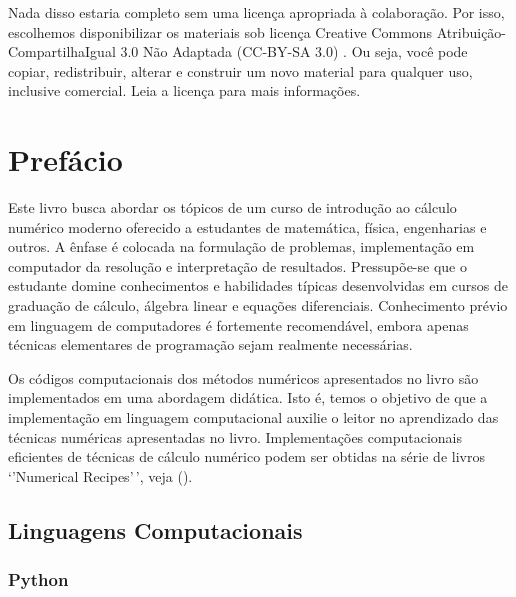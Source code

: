 \documentclass[
  a4paper,
  DIV=11,
  numbers=noendperiod,
  oneside]{scrreprt}
\begin{document}

Nada disso estaria completo sem uma licença apropriada à colaboração.
Por isso, escolhemos disponibilizar os materiais sob licença Creative
Commons Atribuição-CompartilhaIgual 3.0 Não Adaptada (CC-BY-SA 3.0) . Ou
seja, você pode copiar, redistribuir, alterar e construir um novo
material para qualquer uso, inclusive comercial. Leia a licença para
mais informações.


\chapter*{Prefácio}\label{prefuxe1cio}


Este livro busca abordar os tópicos de um curso de introdução ao cálculo
numérico moderno oferecido a estudantes de matemática, física,
engenharias e outros. A ênfase é colocada na formulação de problemas,
implementação em computador da resolução e interpretação de resultados.
Pressupõe-se que o estudante domine conhecimentos e habilidades típicas
desenvolvidas em cursos de graduação de cálculo, álgebra linear e
equações diferenciais. Conhecimento prévio em linguagem de computadores
é fortemente recomendável, embora apenas técnicas elementares de
programação sejam realmente necessárias.

Os códigos computacionais dos métodos numéricos apresentados no livro
são implementados em uma abordagem didática. Isto é, temos o objetivo de
que a implementação em linguagem computacional auxilie o leitor no
aprendizado das técnicas numéricas apresentadas no livro. Implementações
computacionais eficientes de técnicas de cálculo numérico podem ser
obtidas na série de livros `'Numerical Recipes'\,', veja
().

\section*{Linguagens Computacionais}\label{linguagens-computacionais}


\subsection{Python}
\end{document}
